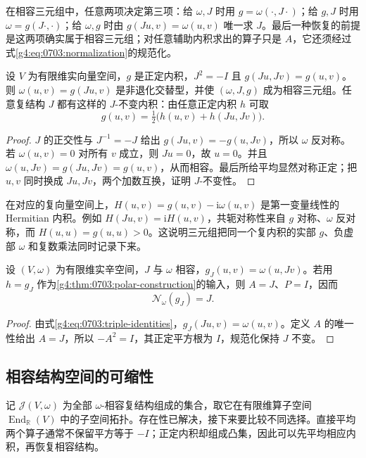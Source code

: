 在相容三元组中，任意两项决定第三项：给 \(\omega,J\) 时用 \(g=\omega(\cdot,J\cdot)\)；给 \(g,J\) 时用 \(\omega=g(J\cdot,\cdot)\)；给 \(\omega,g\) 时由 \(g(Ju,v)=\omega(u,v)\) 唯一求 \(J\)。最后一种恢复的前提是这两项确实属于相容三元组；对任意辅助内积求出的算子只是 \(A\)，它还须经过式\eqref{g4:eq:0703:normalization}的规范化。

\begin{proposition}\label{g4:prop:0703:orthogonal-complex}
	设 \(V\) 为有限维实向量空间，\(g\) 是正定内积，\(J^2=-I\) 且 \(g(Ju,Jv)=g(u,v)\)。则 \(\omega(u,v)=g(Ju,v)\) 是非退化交替型，并使 \((\omega,J,g)\) 成为相容三元组。任意复结构 \(J\) 都有这样的 \(J\)-不变内积：由任意正定内积 \(h\) 可取
	\[
		g(u,v)=\tfrac12\bigl(h(u,v)+h(Ju,Jv)\bigr).
	\]
\end{proposition}
\begin{proof}
	\(J\) 的正交性与 \(J^{-1}=-J\) 给出 \(g(Ju,v)=-g(u,Jv)\)，所以 \(\omega\) 反对称。若 \(\omega(u,v)=0\) 对所有 \(v\) 成立，则 \(Ju=0\)，故 \(u=0\)。并且 \(\omega(u,Jv)=g(Ju,Jv)=g(u,v)\)，从而相容。最后所给平均显然对称正定；把 \(u,v\) 同时换成 \(Ju,Jv\)，两个加数互换，证明 \(J\)-不变性。
\end{proof}

在对应的复向量空间上，\(H(u,v)=g(u,v)-\mathrm{i}\omega(u,v)\) 是第一变量线性的 Hermitian 内积。例如 \(H(Ju,v)=\mathrm{i}H(u,v)\)，共轭对称性来自 \(g\) 对称、\(\omega\) 反对称，而 \(H(u,u)=g(u,u)>0\)。这说明三元组把同一个复内积的实部 \(g\)、负虚部 \(\omega\) 和复数乘法同时记录下来。

\begin{corollary}\label{g4:cor:0703:normalization-retraction}
	设 \((V,\omega)\) 为有限维实辛空间，\(J\) 与 \(\omega\) 相容，\(g_J(u,v)=\omega(u,Jv)\)。若用 \(h=g_J\) 作为\cref{g4:thm:0703:polar-construction}的输入，则 \(A=J\)、\(P=I\)，因而
	\[
		\mathcal N_\omega(g_J)=J.
	\]
\end{corollary}
\begin{proof}
	由式\eqref{g4:eq:0703:triple-identities}，\(g_J(Ju,v)=\omega(u,v)\)。定义 \(A\) 的唯一性给出 \(A=J\)，所以 \(-A^2=I\)，其正定平方根为 \(I\)，规范化保持 \(J\) 不变。
\end{proof}

\subsection{相容结构空间的可缩性}
\label{g4:subsec:0703:03}

记 \(\mathcal J(V,\omega)\) 为全部 \(\omega\)-相容复结构组成的集合，取它在有限维算子空间 \(\operatorname{End}_{\mathbb R}(V)\) 中的子空间拓扑。存在性已解决，接下来要比较不同选择。直接平均两个算子通常不保留平方等于 \(-I\)；正定内积却组成凸集，因此可以先平均相应内积，再恢复相容结构。

